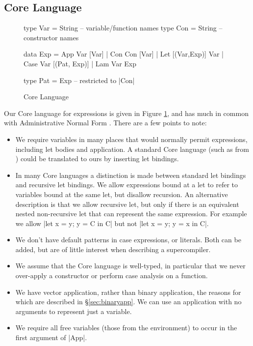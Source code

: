 \documentclass[draft]{sigplanconf}
\begin{document}
\subsection{Core Language}
\label{sec:core}

\begin{figure}
\begin{code}
type Var   =   String -- variable/function names
type Con   =   String -- constructor names

data Exp   =   App Var [Var]
           |   Con Con [Var]
           |   Let [(Var,Exp)] Var
           |   Case Var [(Pat, Exp)]
           |   Lam Var Exp

type Pat   =   Exp -- restricted to |Con|
\end{code}
\caption{Core Language}
\label{fig:core}
\end{figure}

Our Core language for expressions is given in Figure \ref{fig:core}, and has much in common with Administrative Normal Form \cite{flanagan:continuations}. There are a few points to note:

\begin{itemize}
\item We require variables in many places that would normally permit expressions, including let bodies and application. A standard Core language (such as from \citet{ghc_core}) could be translated to ours by inserting let bindings.
\item In many Core languages a distinction is made between standard let bindings and recursive let bindings. We allow expressions bound at a let to refer to variables bound at the same let, but disallow recursion. An alternative description is that we allow recursive let, but only if there is an equivalent nested non-recursive let that can represent the same expression. For example we allow |let x = y; y = C in C| but not |let x = y; y = x in C|.
\item We don't have default patterns in case expressions, or literals. Both can be added, but are of little interest when describing a supercompiler.
\item We assume that the Core language is well-typed, in particular that we never over-apply a constructor or perform case analysis on a function.
\item We have vector application, rather than binary application, the reasons for which are described in \S\ref{sec:binaryapp}. We can use an application with no arguments to represent just a variable.
\item We require all free variables (those from the environment) to occur in the first argument of |App|.
\end{itemize}
\end{document}

